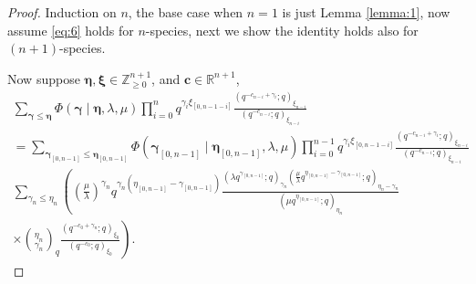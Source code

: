 \documentclass{ximera}
\begin{document}
\begin{proof}
Induction on $n$, the base case when $n=1$ is just Lemma \ref{lemma:1}, now assume \eqref{eq:6} holds for $n$-species, next we show the identity holds also for $(n+1)$-species.

Now suppose $\boldsymbol\eta,\boldsymbol\xi\in\mathbb{Z}^{n+1}_{\ge 0}$, and $\boldsymbol{c}\in\mathbb{R}^{n+1}$,%
\begin{multline}\label{eq:3}
    \sum_{\boldsymbol\gamma\le \boldsymbol\eta }\Phi(\boldsymbol\gamma\mid\boldsymbol\eta,\lambda,\mu) \prod_{i=0}^{n}q^{\gamma_i\xi_{[0,n-1-i]}}\frac{\left(q^{-c_{n-i}+\gamma_{i}};q\right)_{\xi_{n-i}}}{\left(q^{-c_{n-i}};q\right)_{\xi_{n-i}}}\\
    =\sum_{\boldsymbol\gamma_{[0,n-1]}\le \boldsymbol\eta_{[0,n-1]}}\Phi(\boldsymbol\gamma_{[0,n-1]}\mid\boldsymbol\eta_{[0,n-1]},\lambda,\mu)\prod_{i=0}^{n-1}q^{\gamma_i\xi_{[0,n-1-i]}}\frac{\left(q^{-c_{n-i}+\gamma_{i}};q\right)_{\xi_{n-i}}}{\left(q^{-c_{n-i}};q\right)_{\xi_{n-i}}}\\
    \sum_{\gamma_{n}\le \eta_{n}}\left(\left(\frac{\mu}{\lambda}\right)^{\gamma_n}q^{\gamma_n(\eta_{[0,n-1]}-\gamma_{[0,n-1]})}\frac{(\lambda q^{\gamma_{[0,n-1]}};q)_{\gamma_n}(\frac{\mu}{\lambda} q^{\eta_{[0,n-1]}-\gamma_{[0,n-1]}};q)_{\eta_{n}-\gamma_{n}}}{(\mu q^{\eta_{[0,n-1]}};q)_{\eta_n}}\right.\\
    \left.\times\binom{\eta_n}{\gamma_n}_q\frac{\left(q^{-c_{0}+\gamma_{n}};q\right)_{\xi_{0}}}{\left(q^{-c_{0}};q\right)_{\xi_{0}}}\right).
\end{multline}


\end{proof}
\end{document}
